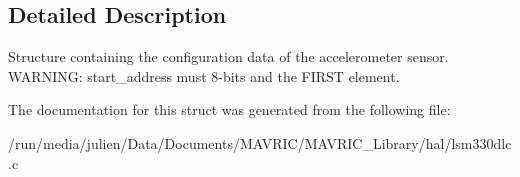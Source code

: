 \subsection{Detailed Description}
Structure containing the configuration data of the accelerometer sensor. W\+A\+R\+N\+I\+N\+G\+: start\+\_\+address must 8-\/bits and the F\+I\+R\+S\+T element. 

The documentation for this struct was generated from the following file\+:\begin{DoxyCompactItemize}
\item 
/run/media/julien/\+Data/\+Documents/\+M\+A\+V\+R\+I\+C/\+M\+A\+V\+R\+I\+C\+\_\+\+Library/hal/lsm330dlc.\+c\end{DoxyCompactItemize}
